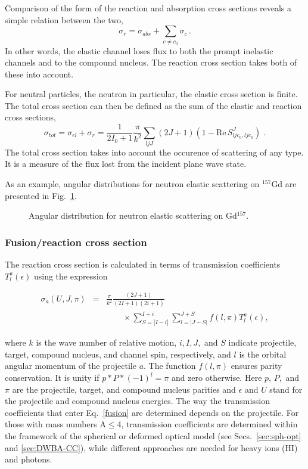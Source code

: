 Comparison of the form of the reaction and absorption cross sections reveals
a simple relation between the two,
\begin{equation}
\sigma_{r}=\sigma_{abs}+\sum_{c\neq c_{0}}\sigma_{c}\,.
\end{equation}
In other words, the elastic channel loses flux to both the prompt inelastic
channels and to the compound nucleus. The reaction cross section takes both
of these into account.

For neutral particles, the neutron in particular, the elastic cross section
is finite. The total cross section can then be defined as the sum of the
elastic and reaction cross sections,
\begin{equation}
\sigma_{tot}=\sigma_{el}+\sigma_{r}=\frac{1}{2I_{0}+1}\frac{\pi}{k^{2}}%
\sum_{ljJ}(2J+1)(1-\text{Re}\, S_{ljc_{0},ljc_{0}}^{J})\;.
\end{equation}
The total cross section takes into account the occurence of scattering of
any type. It is a measure of the flux lost from the incident plane wave
state.

As an example, angular distributions for neutron elastic scattering on $%
^{157}$Gd are presented in Fig.~\ref{njoygd157}.
\begin{figure}[htbp]
\caption{Angular distribution for neutron elastic scattering on Gd$^{157}$.}
\label{njoygd157}
\end{figure}

\subsubsection{Fusion/reaction cross section\label{sec:fusion}}

The reaction cross section is calculated in terms of transmission
coefficients $T_{l}^{a}(\epsilon)$ using the expression

\begin{eqnarray}
\sigma_{a}(U,J,\pi) & = &
\frac{\pi}{k^{2}}\frac{(2J+1)}{(2I+1)(2i+1)}  \label{fusion} \\
& & \qquad\times
\sum_{S=|I-i|}^{I+i}\sum_{l=|J-S|}^{J+S}f(l,\pi)T_{l}^{a}(\epsilon),
\nonumber
\end{eqnarray}

\noindent where $k$ is the wave number of relative motion, $i,I,J,$ and $S$
indicate projectile, target, compound nucleus, and channel spin,
respectively, and $l$ is the orbital angular momentum of the projectile $a$.
The function $f(l,\pi)$ ensures parity conservation. It is unity if $%
p*P*(-1)^{l}=\pi$ and zero otherwise. Here $p,\, P,$ and $\pi$ are the
projectile, target, and compound nucleus parities and $\epsilon$ and $U$
stand for the projectile and compound nucleus energies. The way the
transmission coefficients that enter Eq.~\ref{fusion} are determined depends
on the projectile. For those with mass numbers A$\leq$4, transmission
coefficients are determined within the framework of the spherical or
deformed optical model (see Secs.~\ref{sec:sph-opt} and \ref{sec:DWBA-CC}),
while different approaches are needed for heavy ions (HI) and photons.

